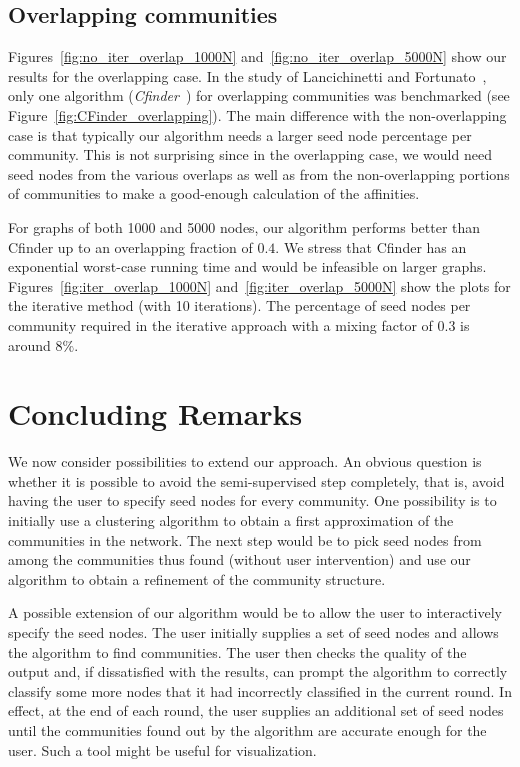 \subsection{Overlapping communities}
Figures~\ref{fig:no_iter_overlap_1000N} and~\ref{fig:no_iter_overlap_5000N} 
show our results for the overlapping case. In the study of Lancichinetti and Fortunato~\cite{LF09}, 
only one algorithm (\emph{Cfinder}~\cite{PDFV05}) for overlapping communities was benchmarked 
(see Figure~\ref{fig:CFinder_overlapping}). 
The main difference with the non-overlapping case is that typically our algorithm needs a larger 
seed node percentage per community. This is not surprising since in the overlapping case, we would 
need seed nodes from the various overlaps as well as from the non-overlapping portions of communities 
to make a good-enough calculation of the affinities. 

For graphs of both 1000 and 5000 nodes, our algorithm performs better 
than Cfinder up to an overlapping fraction of $0.4$. We stress that Cfinder 
has an exponential worst-case running time and would be infeasible on larger graphs. 
%
Figures~\ref{fig:iter_overlap_1000N} and~\ref{fig:iter_overlap_5000N} show the 
plots for the iterative method (with 10 iterations). 
The percentage of seed nodes per community required in the 
iterative approach with a mixing factor of $0.3$ is around 8$\%$. 

\section{Concluding Remarks}
We now consider possibilities to extend our approach. 
An obvious question is whether it is possible to avoid the semi-supervised 
step completely, that is, avoid having the user to specify seed nodes 
for every community. One possibility is to initially use a clustering 
algorithm to obtain a first approximation of the communities in the network. 
The next step would be to pick seed nodes from among the communities thus found 
(without user intervention) and use our algorithm to obtain a refinement of the 
community structure. 


A possible extension of our algorithm would be to allow the user to interactively 
specify the seed nodes. The user initially supplies a set of seed nodes 
and allows the algorithm to find communities. The user then checks the 
quality of the output and, if dissatisfied with the results, can prompt the algorithm 
to correctly classify some more nodes that it had incorrectly classified in the current round. 
In effect, at the end of each round, the user supplies an additional set of seed nodes until the 
communities found out by the algorithm are accurate enough for the user. Such a tool 
might be useful for visualization.

